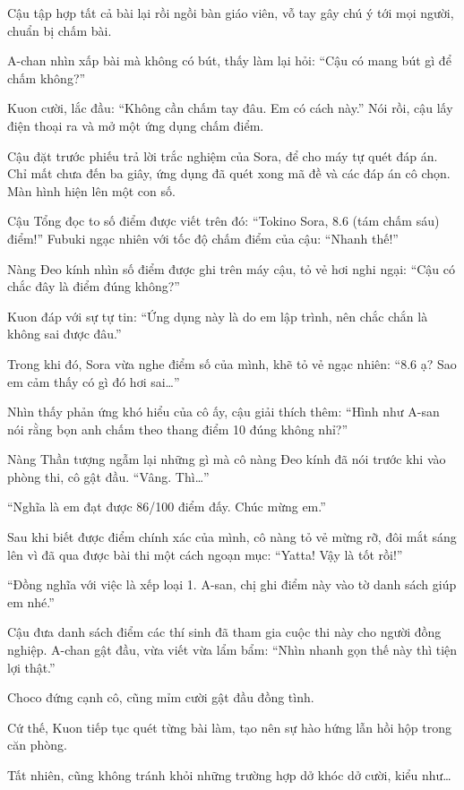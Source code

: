 \documentclass[../main.tex]{subfiles}
\begin{document}
Cậu tập hợp tất cả bài lại rồi ngồi bàn giáo viên, vỗ tay gây chú ý tới mọi người, chuẩn bị chấm bài.

A-chan nhìn xấp bài mà không có bút, thấy làm lại hỏi: ``Cậu có mang bút gì để chấm không?''

Kuon cười, lắc đầu: ``Không cần chấm tay đâu. Em có cách này.'' Nói rồi, cậu lấy điện thoại ra và mở một ứng dụng chấm điểm.

Cậu đặt trước phiếu trả lời trắc nghiệm của Sora, để cho máy tự quét đáp án. Chỉ mất chưa đến ba giây, ứng dụng đã quét xong mã đề và các đáp án cô chọn. Màn hình hiện lên một con số.

Cậu Tổng đọc to số điểm được viết trên đó: ``Tokino Sora, 8.6 (tám chấm sáu) điểm!'' Fubuki ngạc nhiên với tốc độ chấm điểm của cậu: ``Nhanh thế!''

Nàng Đeo kính nhìn số điểm được ghi trên máy cậu, tỏ vẻ hơi nghi ngại: ``Cậu có chắc đây là điểm đúng không?''

Kuon đáp với sự tự tin: ``Ứng dụng này là do em lập trình, nên chắc chắn là không sai được đâu.''

Trong khi đó, Sora vừa nghe điểm số của mình, khẽ tỏ vẻ ngạc nhiên: ``8.6 ạ? Sao em cảm thấy có gì đó hơi sai\dots''

Nhìn thấy phản ứng khó hiểu của cô ấy, cậu giải thích thêm: ``Hình như A-san nói rằng bọn anh chấm theo thang điểm 10 đúng không nhỉ?''

Nàng Thần tượng ngẫm lại những gì mà cô nàng Đeo kính đã nói trước khi vào phòng thi, cô gật đầu. ``Vâng. Thì\dots''

``Nghĩa là em đạt được 86/100 điểm đấy. Chúc mừng em.''

Sau khi biết được điểm chính xác của mình, cô nàng tỏ vẻ mừng rỡ, đôi mắt sáng lên vì đã qua được bài thi một cách ngoạn mục: ``Yatta! Vậy là tốt rồi!''

``Đồng nghĩa với việc là xếp loại 1. A-san, chị ghi điểm này vào tờ danh sách giúp em nhé.''

Cậu đưa danh sách điểm các thí sinh đã tham gia cuộc thi này cho người đồng nghiệp. A-chan gật đầu, vừa viết vừa lẩm bẩm: ``Nhìn nhanh gọn thế này thì tiện lợi thật.''

Choco đứng cạnh cô, cũng mỉm cười gật đầu đồng tình.

Cứ thế, Kuon tiếp tục quét từng bài làm, tạo nên sự hào hứng lẫn hồi hộp trong căn phòng.

\ct

Tất nhiên, cũng không tránh khỏi những trường hợp dở khóc dở cười, kiểu như\dots
\end{document}

